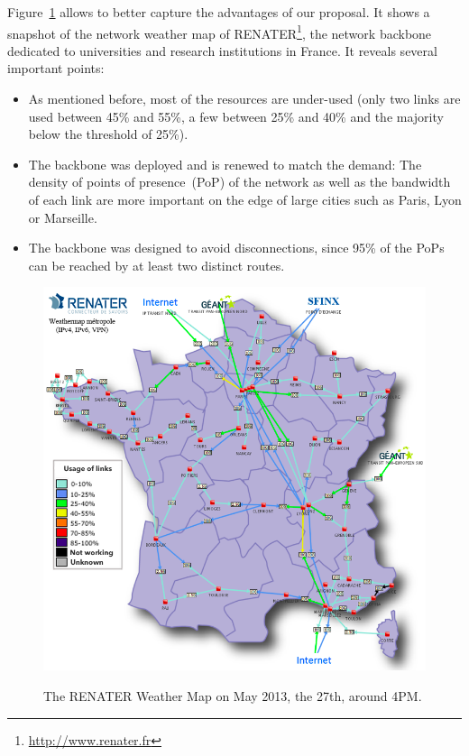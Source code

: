 Figure~\ref{fig:renater} allows to better capture the advantages of our proposal.
It
 shows a snapshot of the network weather
map of RENATER\footnote{\href{http://www.renater.fr}{http://www.renater.fr}}, the network backbone dedicated to universities and research
institutions in France. It reveals several important points: 
\begin{itemize} 
\item As mentioned before, most of the resources are under-used (only two links are used between 45\% and 55\%, a few between 25\% and 40\% and the majority below the threshold of 25\%). 
\item The backbone was deployed and is renewed to match the demand: The density of
points of presence~(PoP) of the network as well as the bandwidth of each link are more important on the edge of large cities such as Paris, Lyon or
Marseille. 
\item The backbone was designed to avoid disconnections, since 95\% of the PoPs can be reached by at least two distinct routes.
\end{itemize}


\begin{figure}[b]
\includegraphics[width=12cm]{./FIGS/renater.png}
\vspace*{-.3cm}
\label{fig:renater}
\caption{The RENATER Weather Map on May 2013, the 27th, around 4PM.}
\vspace*{-.3cm}
\end{figure}

